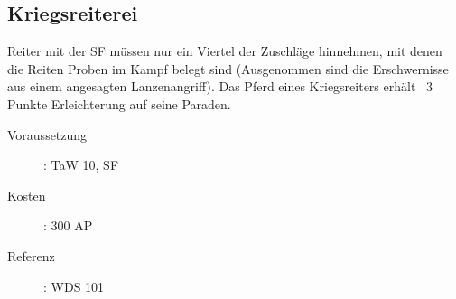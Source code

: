 \subsection{Kriegsreiterei}
\label{sf.kriegsreiterei}
Reiter mit der SF  müssen nur ein Viertel der Zuschläge hinnehmen, mit denen die Reiten Proben im Kampf belegt sind (Ausgenommen sind die Erschwernisse aus einem angesagten Lanzenangriff).
Das Pferd eines Kriegsreiters erhält \ 3 Punkte Erleichterung auf seine Paraden.
\begin{description}
    \item[Voraussetzung]:
        TaW  10, SF 
    \item [Kosten]:
        300 AP
    \item [Referenz]:
        WDS 101
\end{description}
